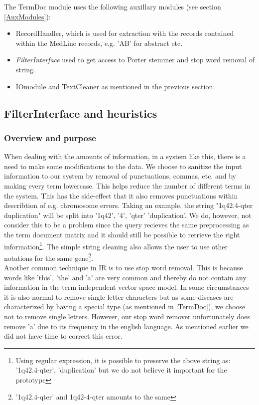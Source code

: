 The TermDoc module uses the following auxillary modules (see section
\ref{AuxModules}):

\begin{itemize}
  \item RecordHandler, which is used for extraction with the records contained
within the MedLine records, e.g. 'AB' for abstract etc.
  \item \textit{FilterInterface} used to get access to Porter stemmer and stop
word removal of string.
  \item IOmodule and TextCleaner as mentioned in the previous section.
\end{itemize}


\subsection{FilterInterface and heuristics}

\subsubsection{Overview and purpose}
When dealing with the amounts of information, in a system like this,
there is a need to make some modifications to the data. We choose to
sanitize the input information to our system by removal of
punctuations, commas, etc. and by making every term lowercase. This
helps reduce the number of different terms in the system. This has the
side-effect that it also removes punctuations within describtion of
e.g. chromosome errors. Taking an example, the string "1q42.4-qter
duplication" will be split into '1q42', '4', 'qter' 'duplication'. We
do, however, not consider this to be a problem since the query
recieves the same preprocessing as the term document matrix and it
should still be possible to retrieve the right
information\footnote{Using regular expression, it is possible to
  preserve the above string as: '1q42.4-qter', 'duplication' but we do
  not believe it important for the prototype}. The simple string
cleaning also allows the user to use other notations for the same
gene\footnote{'1q42.4-qter' and 1q42-4-qter amounts to the same}.\\

Another common technique in IR is to use stop word removal. This is
because words like 'this', 'the' and 'a' are very common and thereby
do not contain any information in the term-independent vector space
model. In some circumstances it is also normal to remove single letter
characters but as some diseases are characterized by having a special
type (as mentioned in \ref{TermDoc}), we choose not to remove single
letters. However, our stop word remover unfortunately does remove 'a'
due to its frequency in the english language. As mentioned earlier we
did not have time to correct this error.\\

